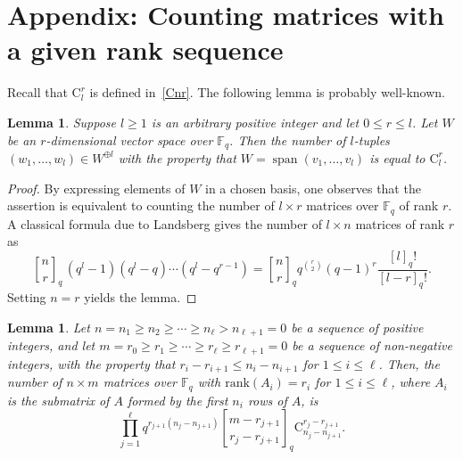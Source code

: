 \documentclass[12pt,a4paper,reqno]{amsart}
\theoremstyle{plain}
\newtheorem{lemma}[theorem]{Lemma}
\theoremstyle{definition}
\newcommand{\FF}{{\mathbb{F}}}
\newcommand{\1}{\mathds{1}}
\DeclareMathOperator{\spn}{span}
\begin{document}
\section{Appendix: Counting matrices with a given rank sequence}




Recall that $\mathrm{C}^r_l$ is defined in~\cref{Cnr}. The following lemma is probably well-known.
\begin{lemma}\label{rank1} Suppose $l\ge 1$ is an arbitrary positive integer and  let $ 0 \le r \le l$. Let $W$ be an $r$-dimensional vector space over $\FF_q$. Then the number of $l$-tuples $(w_1, \dots, w_l) \in W^{\oplus l}$ with the property that $W= \spn(v_1, \dots, v_l)$ is equal to $\mathrm{C}_l^r$. 
\end{lemma}
\begin{proof}
By expressing elements of  $W$ in a chosen basis, one observes that the assertion is equivalent to counting the number of $l \times r$ matrices over $\mathbb{F}_q$ of rank $r$. A classical formula due to Landsberg gives the number of $l \times n$ matrices of rank $r$ as
\[
{n \brack r}_q \, \left( q^l - 1 \right) \left( q^l - q \right) \cdots \left( q^l - q^{r-1} \right)
= {n \brack r}_q q^{\binom{r}{2}} (q-1)^r \frac{[l]_q!}{[l - r]_q!}.
\]
Setting $n = r$ yields the lemma.
\end{proof}



\begin{lemma}\label{rank_profile} Let $n = n_1 \geq n_2 \geq \cdots \geq n_\ell > n_{\ell+1} = 0$ be a sequence of positive integers, and let $m = r_0 \geq r_1 \geq \cdots \geq r_\ell \geq r_{\ell+1} = 0$ be a sequence of non-negative integers, with the property that $r_i - r_{i+1} \leq n_i - n_{i+1}$ for $1 \leq i \leq \ell$. Then, the number of $n \times m$ matrices over $\mathbb{F}_q$ with $\text{rank}(A_i) = r_i$ for $1 \leq i \leq \ell$, where $A_i$ is the submatrix of $A$ formed by the first $n_i$ rows of $A$, is
\begin{equation}\label{rank_profile:number}
    \prod_{j=1}^{\ell}q^{r_{j+1}(n_j-n_{j+1})}{m-r_{j+1}\brack r_{j}-r_{j+1}}_q\mathrm{C}^{r_j-r_{j+1}}_{n_j-n_{j+1}}.
\end{equation}
\end{lemma}
\end{document}
